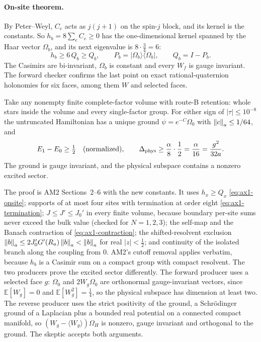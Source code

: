 \paragraph{On-site theorem.}
By Peter--Weyl, $C_e$ acts as $j(j+1)$ on the spin-$j$ block, and its kernel
is the constants. So $h_b=8\sum_eC_e\ge0$ has the one-dimensional kernel
spanned by the Haar vector $\Omega_b$, and its next eigenvalue is
$8\cdot\tfrac34=6$:
\begin{equation}
 h_b\ge6\,Q_b\ge Q_b,\qquad P_b=|\Omega_b\rangle\langle\Omega_b|,\qquad
 Q_b=I-P_b .
 \label{eq:ax1-onsite}
\end{equation}
The Casimirs are bi-invariant, $\Omega_b$ is constant and every $W_f$ is gauge
invariant. The forward checker confirms the last point on exact
rational-quaternion holonomies for six faces, among them $W$ and selected
faces.

\begin{proposition}
\label{prop:ax1-gap}
Take any nonempty finite complete-factor volume with route-B retention: whole
stars inside the volume and every single-factor group. For either sign of
$|\tau|\le10^{-8}$ the untruncated Hamiltonian has a unique ground
$\psi=e^{-C}\Omega_0$ with $\left\lVert c\right\rVert_a\le1/64$, and
\[
 E_1-E_0\ge\tfrac12\quad\text{(normalized)},\qquad
 \Delta_{\rm phys}\ge\frac\alpha8\cdot\frac12=\frac\alpha{16}=\frac{g^2}{32a}.
\]
The ground is gauge invariant, and the physical subspace contains a nonzero
excited sector.
\end{proposition}
The proof is AM2 Sections~2--6 with the new constants. It uses $h_x\ge Q_x$
\eqref{eq:ax1-onsite}; supports of at most four sites with termination at
order eight \eqref{eq:ax1-termination}; $J\le J'\le J_0'$ in every finite
volume, because boundary per-site sums never exceed the bulk value (checked
for $N=1,2,3$); the self-map and the Banach contraction of
\eqref{eq:ax1-contraction}; the shifted-resolvent exclusion
$\left\lVert b\right\rVert_a\le2J_0'G'(R_a)\left\lVert b\right\rVert_a<\left\lVert b\right\rVert_a$ for real $|z|<\tfrac12$; and
continuity of the isolated branch along the coupling from $0$. AM2's cutoff
removal applies verbatim, because $h_b$ is a Casimir sum on a compact group
with compact resolvent. The two producers prove the excited sector
differently. The forward producer uses a selected face $g$: $\Omega_0$ and
$2W_g\Omega_0$ are orthonormal gauge-invariant vectors, since
$\mathbb E[W_g]=0$ and $\mathbb E[W_g^2]=\tfrac14$, so the physical subspace
has dimension at least two. The reverse producer uses the strict positivity of
the ground, a Schr\"odinger ground of a Laplacian plus a bounded real
potential on a connected compact manifold, so
$(W_g-\langle W_g\rangle)\Omega_H$ is nonzero, gauge invariant and orthogonal
to the ground. The skeptic accepts both arguments.

